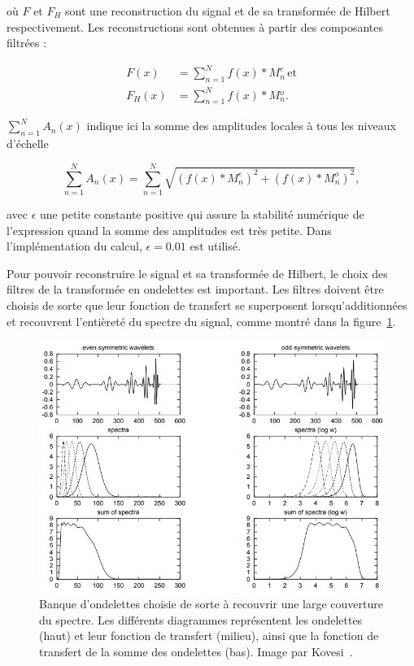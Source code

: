 \noindent où $F$ et $F_H$ sont une reconstruction du signal et de sa transformée de Hilbert respectivement. Les reconstructions sont obtenues à partir des composantes filtrées :

\begin{align}
    F(x) &= \sum_{n=1}^{N} f(x)*M_n^e \,\text{et}\\
    F_H(x) &= \sum_{n=1}^{N} f(x)*M{_n^o}.
\end{align}

\noindent $\sum_{n=1}^{N} A_n(x)$ indique ici la somme des amplitudes locales à tous les niveaux d'échelle

\begin{equation}
    \sum_{n=1}^{N} A_n(x) = \sum_{n=1}^{N} \sqrt{(f(x)*M^e_n)^2 + (f(x)*M^o_n)^2},
\end{equation}

\noindent avec $\epsilon$ une petite constante positive qui assure la stabilité numérique de l'expression quand la somme des amplitudes est très petite. Dans l'implémentation du calcul, $\epsilon = 0.01$ est utilisé.

\bigskip

Pour pouvoir reconstruire le signal et sa transformée de Hilbert, le choix des filtres de la transformée en ondelettes est important. Les filtres doivent être choisis de sorte que leur fonction de transfert se superposent lorsqu'additionnées et recouvrent l'entièreté du spectre du signal, comme montré dans la figure~\ref{fig:wavelet-spectrum-coverage}.

\begin{figure}
           \centering
           \includegraphics[width=.60\textwidth]{contenu/resources/images/wavelet_spectrum_coverage}
           \caption[Choix des ondelettes pour recouvrir le spectre et permettre la reconstruction du signal]{Banque d'ondelettes choisie de sorte à recouvrir une large couverture du spectre. Les différents diagrammes représentent les ondelettes (haut) et leur fonction de transfert (milieu), ainsi que la fonction de transfert de la somme des ondelettes (bas). Image par Kovesi~\cite{kovesi_image_1995}.}
           \label{fig:wavelet-spectrum-coverage}
\end{figure}

